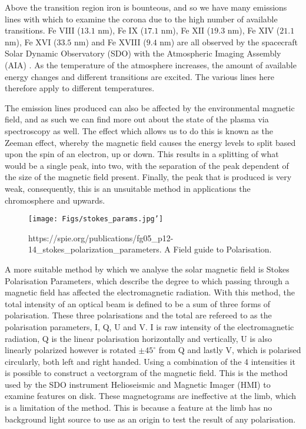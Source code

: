 Above the transition region iron is bounteous, and so we have many emissions lines with which to examine the corona due to the high number of available transitions.
Fe VIII ($13.1$ nm), Fe IX ($17.1$ nm), Fe XII ($19.3$ nm), Fe XIV ($21.1$ nm), Fe XVI ($33.5$ nm) and Fe XVIII ($9.4$ nm) are all observed by the spacecraft Solar Dynamic Observatory (SDO) with the Atmospheric Imaging Assembly (AIA) \cite{Schmelz2013}.
As the temperature of the atmosphere increases, the amount of available energy changes and different transitions are excited.
The various lines here therefore apply to different temperatures.



The emission lines produced can also be affected by the environmental magnetic field, and as such we can find more out about the state of the plasma via spectroscopy as well. %
The effect which allows us to do this is known as the Zeeman effect, whereby the magnetic field causes the energy levels to split based upon the spin of an electron, up or down.
This results in a splitting of what would be a single peak, into two, with the separation of the peak dependent of the size of the magnetic field present.
Finally, the peak that is produced is very weak, consequently, this is an unsuitable method in applications the chromosphere and upwards.


\begin{figure}
	\texttt{[image: Figs/stokes\_params.jpg']}
	\label{stokes}
	\caption{https://spie.org/publications/fg05_p12-14_stokes_polarization_parameters. A Field guide to Polarisation.}
\end{figure}

A more suitable method by which we analyse the solar magnetic field is Stokes Polarisation Parameters, which describe the degree to which passing through a magnetic field has affected the electromagnetic radiation.
With this method, the total intensity of an optical beam is defined to be a sum of three forms of polarisation.
These three polarisations and the total are refereed to as the polarisation parameters, I, Q, U and V.
I is raw intensity of the electromagnetic radiation, Q is the linear polarisation horizontally and vertically, U is also linearly polarized however is rotated $\pm45^\circ$ from Q and lastly V, which is polarised circularly, both left and right handed.
Using a combination of the 4 intensities it is possible to construct a vectorgram of the magnetic field.
This is the method used by the SDO instrument Helioseismic and Magnetic Imager (HMI) to examine features on disk.
These magnetograms are ineffective at the limb, which is a limitation of the method.
This is because a feature at the limb has no background light source to use as an origin to test the result of any polarisation. 

